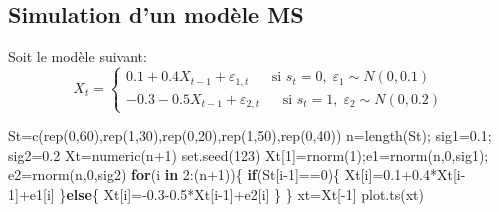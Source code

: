 \documentclass[
  french,
]{article}
\newenvironment{Shaded}{\begin{snugshade}}{\end{snugshade}}
\newcommand{\ControlFlowTok}[1]{\textcolor[rgb]{0.13,0.29,0.53}{\textbf{#1}}}
\newcommand{\DecValTok}[1]{\textcolor[rgb]{0.00,0.00,0.81}{#1}}
\newcommand{\FloatTok}[1]{\textcolor[rgb]{0.00,0.00,0.81}{#1}}
\newcommand{\FunctionTok}[1]{\textcolor[rgb]{0.00,0.00,0.00}{#1}}
\newcommand{\NormalTok}[1]{#1}
\newcommand{\OtherTok}[1]{\textcolor[rgb]{0.56,0.35,0.01}{#1}}
\newcommand{\SpecialCharTok}[1]{\textcolor[rgb]{0.00,0.00,0.00}{#1}}
\begin{document}
\hypertarget{simulation-dun-moduxe8le-ms}{%
\subsection{Simulation d'un modèle
MS}\label{simulation-dun-moduxe8le-ms}}

Soit le modèle suivant: \[
X_t=\begin{cases}
0.1+0.4 X_{t-1}+\varepsilon_{1,t}\;\quad \text{ si }s_t = 0,\; \varepsilon_1\sim N(0,0.1)\\
-0.3 -0.5 X_{t-1}+\varepsilon_{2,t}\;\quad \text{ si }s_t=1,\; \varepsilon_2 \sim N(0,0.2)
\end{cases}
\]

\begin{Shaded}
\begin{Highlighting}[]
\NormalTok{St}\OtherTok{=}\FunctionTok{c}\NormalTok{(}\FunctionTok{rep}\NormalTok{(}\DecValTok{0}\NormalTok{,}\DecValTok{60}\NormalTok{),}\FunctionTok{rep}\NormalTok{(}\DecValTok{1}\NormalTok{,}\DecValTok{30}\NormalTok{),}\FunctionTok{rep}\NormalTok{(}\DecValTok{0}\NormalTok{,}\DecValTok{20}\NormalTok{),}\FunctionTok{rep}\NormalTok{(}\DecValTok{1}\NormalTok{,}\DecValTok{50}\NormalTok{),}\FunctionTok{rep}\NormalTok{(}\DecValTok{0}\NormalTok{,}\DecValTok{40}\NormalTok{))}
\NormalTok{n}\OtherTok{=}\FunctionTok{length}\NormalTok{(St); sig1}\OtherTok{=}\FloatTok{0.1}\NormalTok{; sig2}\OtherTok{=}\FloatTok{0.2}
\NormalTok{Xt}\OtherTok{=}\FunctionTok{numeric}\NormalTok{(n}\SpecialCharTok{+}\DecValTok{1}\NormalTok{)}
\FunctionTok{set.seed}\NormalTok{(}\DecValTok{123}\NormalTok{)}
\NormalTok{Xt[}\DecValTok{1}\NormalTok{]}\OtherTok{=}\FunctionTok{rnorm}\NormalTok{(}\DecValTok{1}\NormalTok{);e1}\OtherTok{=}\FunctionTok{rnorm}\NormalTok{(n,}\DecValTok{0}\NormalTok{,sig1); e2}\OtherTok{=}\FunctionTok{rnorm}\NormalTok{(n,}\DecValTok{0}\NormalTok{,sig2)}
\ControlFlowTok{for}\NormalTok{(i }\ControlFlowTok{in} \DecValTok{2}\SpecialCharTok{:}\NormalTok{(n}\SpecialCharTok{+}\DecValTok{1}\NormalTok{))\{}
  \ControlFlowTok{if}\NormalTok{(St[i}\DecValTok{{-}1}\NormalTok{]}\SpecialCharTok{==}\DecValTok{0}\NormalTok{)\{}
\NormalTok{    Xt[i]}\OtherTok{=}\FloatTok{0.1+0.4}\SpecialCharTok{*}\NormalTok{Xt[i}\DecValTok{{-}1}\NormalTok{]}\SpecialCharTok{+}\NormalTok{e1[i]}
\NormalTok{  \}}\ControlFlowTok{else}\NormalTok{\{}
\NormalTok{    Xt[i]}\OtherTok{=}\SpecialCharTok{{-}}\FloatTok{0.3{-}0.5}\SpecialCharTok{*}\NormalTok{Xt[i}\DecValTok{{-}1}\NormalTok{]}\SpecialCharTok{+}\NormalTok{e2[i]}
\NormalTok{  \}}
\NormalTok{\}}
\NormalTok{xt}\OtherTok{=}\NormalTok{Xt[}\SpecialCharTok{{-}}\DecValTok{1}\NormalTok{]}
\FunctionTok{plot.ts}\NormalTok{(xt)}
\end{Highlighting}
\end{Shaded}
\end{document}
